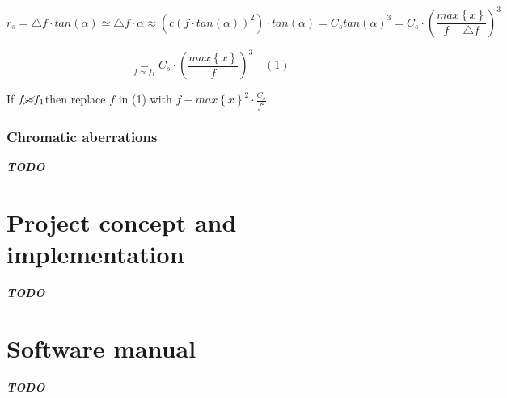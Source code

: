 \documentclass[a4paper,12pt]{article}
\newcommand{\todo}{\textbf{\textit{TODO}} }
\begin{document}
      \[
        r_{s}=\triangle f\cdotp tan\left(\alpha\right)\simeq\triangle f\cdotp\alpha\approx\left(c\left(f\cdotp tan\left(\alpha\right)\right)^{2}\right)\cdotp tan\left(\alpha\right)=C_{s}tan\left(\alpha\right)^{3}=C_{s}\cdotp\left(\frac{max\left\{ x\right\} }{f-\triangle f}\right)^{3}
      \]

      \[
        \underset{f\approx f_{1}}{=}C_{s}\cdotp\left(\frac{max\left\{ x\right\} }{f}\right)^{3}\quad(1)
      \]

      If $f\cancel{\approx}f_{1}$then replace $f$ in (1) with $f-max\left\{ x\right\} ^{2}\cdotp\frac{C_{s}}{f^{2}}$

  \subsubsection{Chromatic aberrations}
    \todo

\newpage

\section{Project concept and implementation}
  \todo

\newpage

\section{Software manual}
  \todo

\newpage

\printbibliography[
heading=bibintoc,
title={References}
]


\end{document}
